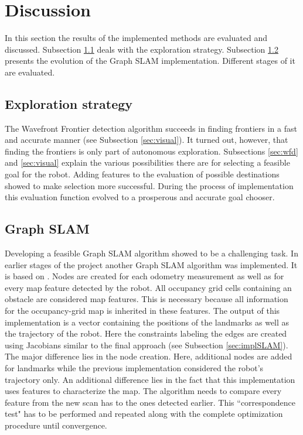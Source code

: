 \documentclass{ba-kecs}
\begin{document}
\section{Discussion}
\label{sec:disc}
In this section the results of the implemented methods are evaluated and discussed. 
Subsection \ref{disc:expl} deals with the exploration strategy. Subsection \ref{disc:grSlam} presents the evolution of the Graph SLAM implementation. Different stages of it are evaluated.
\subsection{Exploration strategy}
\label{disc:expl}
The Wavefront Frontier detection algorithm \citep{Keidar} succeeds in finding frontiers in a fast and accurate manner (see Subsection \ref{sec:visual}). It turned out, however, that finding the frontiers is only part of autonomous exploration. Subsections \ref{sec:wfd} and \ref{sec:visual} explain the various possibilities there are for selecting a feasible goal for the robot. Adding features to the evaluation of possible destinations showed to make selection more successful. During the process of implementation this evaluation function evolved to a prosperous and accurate goal chooser.
\\
\subsection{Graph SLAM}
\label{disc:grSlam}
Developing a feasible Graph SLAM algorithm showed to be a challenging task. In earlier stages of the project another Graph SLAM algorithm was implemented.
It is based on \cite{Thrun}. 
Nodes are created for each odometry measurement as well as for every map feature detected by the robot. All occupancy grid cells containing an obstacle are considered map features. This is necessary because all information for the occupancy-grid map is inherited in these features. The output of this implementation is a vector containing the positions of the landmarks as well as the trajectory of the robot. Here the constraints labeling the edges are created using Jacobians similar to the final approach (see Subsection \ref{sec:implSLAM}). The major difference lies in the node creation. Here, additional nodes are added for landmarks while the previous implementation considered the robot's trajectory only. An additional difference lies in the fact that this implementation uses features to characterize the map. The algorithm needs to compare every feature from the new scan has to the ones detected earlier. This ``correspondence test" has to be performed and repeated along with the complete optimization procedure until convergence. 
\end{document}
